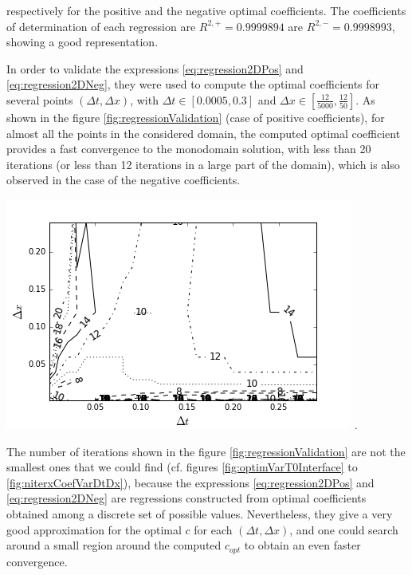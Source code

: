 \noindent respectively for the positive and the negative optimal coefficients. The coefficients of determination of each regression are $R^{2,+} = 0.9999894$ are $R^{2,-} = 0.9998993$, showing a good representation.

\indent In order to validate the expressions \eqref{eq:regression2DPos} and \eqref{eq:regression2DNeg}, they were used to compute the optimal coefficients for several points $(\Delta t, \Delta x)$, with $\Delta t \in [0.0005,0.3]$ and $\Delta x \in \left[ \frac{12}{5000},\frac{12}{50} \right]$. As shown in the figure \ref{fig:regressionValidation} (case of positive coefficients), for almost all the points in the considered domain, the computed optimal coefficient provides a fast convergence to the monodomain solution, with less than 20 iterations (or less than 12 iterations in a large part of the domain), which is also observed in the case of the negative coefficients. 

\begingroup
	\centering
	\includegraphics[scale=.6]{figures/FinalFigures/contourValidationP.png}
.
\endgroup

\indent The number of iterations shown in the figure \ref{fig:regressionValidation} are not the smallest ones that we could find (cf. figures \ref{fig:optimVarT0Interface} to \ref{fig:niterxCoefVarDtDx}), because the expressions \eqref{eq:regression2DPos} and \eqref{eq:regression2DNeg} are regressions constructed from optimal coefficients obtained among a discrete set of possible values. Nevertheless, they give a very good approximation for the optimal $c$ for each $(\Delta t, \Delta x)$, and one could search around a small region around the computed $c_{opt}$ to obtain an even faster convergence.


